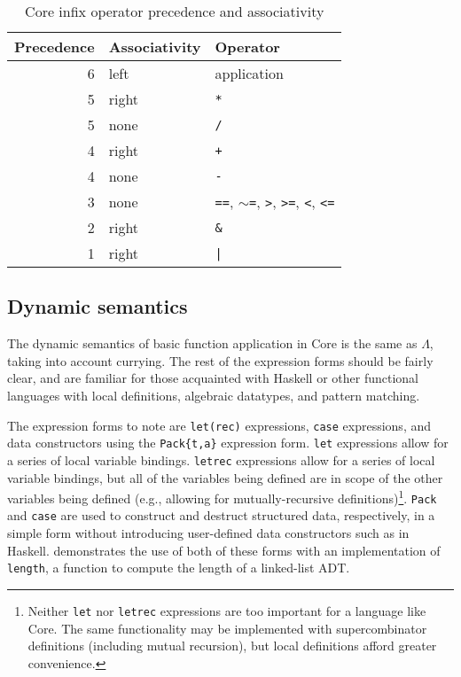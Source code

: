 \begin{table}
  \centering
  \begin{tabular}{r l l}
    \hline
    Precedence & Associativity & Operator \\
    \hline\hline
    6 & left & application \\
    5 & right & \texttt{*} \\
    5 & none & \texttt{/} \\
    4 & right & \texttt{+} \\
    4 & none & \texttt{-} \\
    3 & none & \texttt{==}, \texttt{$\sim$=}, \texttt{>}, \texttt{>=}, \texttt{<}, \texttt{<=} \\
    2 & right & \texttt{\&} \\
    1 & right & \texttt{|} \\
    \hline
  \end{tabular}
  \caption{Core infix operator precedence and associativity}
  \label{tab:core-infix}
\end{table}

\subsection{Dynamic semantics}
\label{sec:dynamic-semantics}

The dynamic semantics of basic function application in Core is the same as $\Lambda$, taking into account currying. The rest of the expression forms should be fairly clear, and are familiar for those acquainted with Haskell or other functional languages with local definitions, algebraic datatypes, and pattern matching.

The expression forms to note are \texttt{let(rec)} expressions, \texttt{case} expressions, and data constructors using the \texttt{Pack\{t,a\}} expression form. \texttt{let} expressions allow for a series of local variable bindings. \texttt{letrec} expressions allow for a series of local variable bindings, but all of the variables being defined are in scope of the other variables being defined (e.g., allowing for mutually-recursive definitions)\footnote{Neither \texttt{let} nor \texttt{letrec} expressions are too important for a language like Core. The same functionality may be implemented with supercombinator definitions (including mutual recursion), but local definitions afford greater convenience.}. \texttt{Pack} and \texttt{case} are used to construct and destruct structured data, respectively, in a simple form without introducing user-defined data constructors such as in Haskell.  demonstrates the use of both of these forms with an implementation of \texttt{length}, a function to compute the length of a linked-list ADT.

